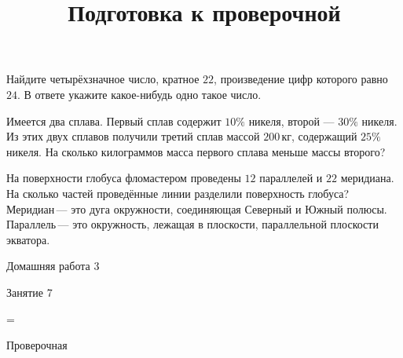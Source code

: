 \begin{class}[number=6]
\begin{listofex}
		\item Найдите четырёхзначное число, кратное \(22\), произведение цифр которого равно \(24\). В ответе укажите какое-нибудь одно такое число.
		\item Имеется два сплава. Первый сплав содержит \(10\%\) никеля, второй --- \(30\%\) никеля. Из этих двух сплавов получили третий сплав массой \(200\) кг, содержащий \(25\%\) никеля. На сколько килограммов масса первого сплава меньше массы второго?
		\item На поверхности глобуса фломастером проведены \(12\) параллелей и \(22\) меридиана. На сколько частей проведённые линии разделили поверхность глобуса? Меридиан --- это дуга окружности, соединяющая Северный и Южный полюсы. Параллель --- это окружность, лежащая в плоскости, параллельной плоскости экватора.
	\end{listofex}
\end{class}

\begin{homework}[number=3]
	\begin{listofex}
		\item Домашняя работа 3
	\end{listofex}
\end{homework}

\begin{class}[number=7]
	\title{Подготовка к проверочной}
	\begin{listofex}
		\item Занятие 7
	\end{listofex}
\end{class}

=%
\begin{exam}
	\begin{listofex}
		\item Проверочная
	\end{listofex}
\end{exam}
